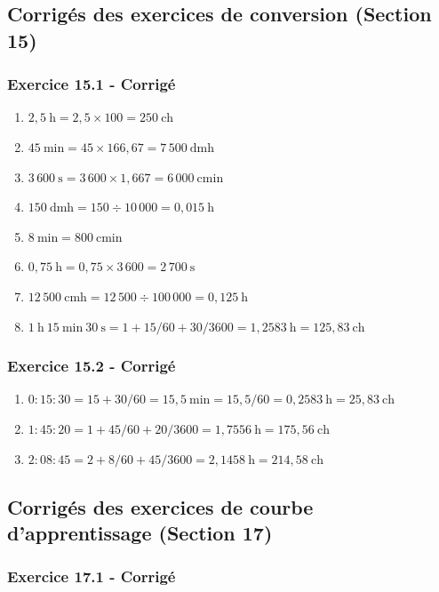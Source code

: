 \documentclass[a4paper,12pt]{article}
\begin{document}
\subsection{Corrigés des exercices de conversion (Section 15)}

\subsubsection{Exercice 15.1 - Corrigé}

\begin{enumerate}
    \item $2,5\ \text{h} = 2,5 \times 100 = 250\ \text{ch}$
    \item $45\ \text{min} = 45 \times 166,67 = 7\,500\ \text{dmh}$
    \item $3\,600\ \text{s} = 3\,600 \times 1,667 = 6\,000\ \text{cmin}$
    \item $150\ \text{dmh} = 150 \div 10\,000 = 0,015\ \text{h}$
    \item $8\ \text{min} = 800\ \text{cmin}$
    \item $0,75\ \text{h} = 0,75 \times 3\,600 = 2\,700\ \text{s}$
    \item $12\,500\ \text{cmh} = 12\,500 \div 100\,000 = 0,125\ \text{h}$
    \item $1\ \text{h}\ 15\ \text{min}\ 30\ \text{s} = 1 + 15/60 + 30/3600 = 1,2583\ \text{h} = 125,83\ \text{ch}$
\end{enumerate}

\subsubsection{Exercice 15.2 - Corrigé}

\begin{enumerate}
    \item $0:15:30 = 15 + 30/60 = 15,5\ \text{min} = 15,5/60 = 0,2583\ \text{h} = 25,83\ \text{ch}$
    \item $1:45:20 = 1 + 45/60 + 20/3600 = 1,7556\ \text{h} = 175,56\ \text{ch}$
    \item $2:08:45 = 2 + 8/60 + 45/3600 = 2,1458\ \text{h} = 214,58\ \text{ch}$
\end{enumerate}

\subsection{Corrigés des exercices de courbe d'apprentissage (Section 17)}

\subsubsection{Exercice 17.1 - Corrigé}
\end{document}
